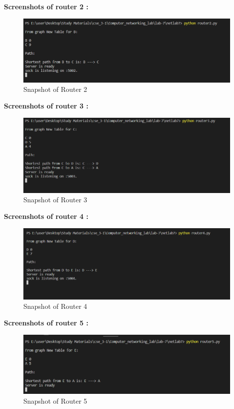 \documentclass[11pt]{article}
\begin{document}
\textbf{Screenshots of router 2 : }\\[12pt]
 \begin{figure}[!h]
\centering
\includegraphics[width=\textwidth]{r2.png}
\caption{Snapshot of Router 2}
\end{figure}
\FloatBarrier

\textbf{Screenshots of router 3 : }\\[12pt]
 \begin{figure}[!h]
\centering
\includegraphics[width=\textwidth]{r3.png}
\caption{Snapshot of Router 3}
\end{figure}
\FloatBarrier

\textbf{Screenshots of router 4 : }\\[12pt]
 \begin{figure}[!h]
\centering
\includegraphics[width=\textwidth]{r4.png}
\caption{Snapshot of Router 4}
\end{figure}
\FloatBarrier

\textbf{Screenshots of router 5 : }\\[12pt]
 \begin{figure}[!h]
\centering
\includegraphics[width=\textwidth]{r5.png}
\caption{Snapshot of Router 5}
\end{figure}
\FloatBarrier
\end{document}
